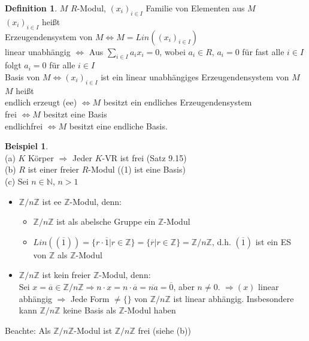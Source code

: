 \documentclass[10pt,a4paper,numbers=endperiod]{scrartcl}
\theoremstyle{definition}
\newtheorem{defi}[satz]{Definition}
\newtheorem{bsp}[satz]{Beispiel}
\def\NN{{\mathbb N}}
\def\ZZ{{\mathbb Z}}
\begin{document}
\begin{defi}
	$M$ $R$-Modul, $(x_i)_{i \in I}$ Familie von Elementen aus $M$\\
	$(x_i)_{i \in I}$ heißt\\
	Erzeugendensystem von $M \Leftrightarrow M = Lin((x_i)_{i \in I})$\\
	linear unabhängig $\Leftrightarrow$ Aus $\sum\limits_{i \in I} a_ix_i = 0$, wobei $a_i \in R$, $a_i = 0$ für fast alle $i \in I$ folgt $a_i = 0$ für alle $i \in I$\\
	Basis von $M \Leftrightarrow (x_i)_{i \in I}$ ist ein linear unabhängiges Erzeugendensystem von $M$\\
	
	$M$ heißt\\
	endlich erzeugt (ee) $\Leftrightarrow M$ besitzt ein endliches Erzeugendensystem\\
	frei $\Leftrightarrow M$ besitzt eine Basis\\
	endlichfrei $\Leftrightarrow M$ besitzt eine endliche Basis.
\end{defi}

\begin{bsp}
	$ $\\
	(a) $K$ Körper $\Rightarrow$ Jeder $K$-VR ist frei (Satz 9.15)\\
	(b) $R$ ist einer freier $R$-Modul ((1) ist eine Basis)\\
	(c) Sei $n \in \NN$, $n > 1$
	\begin{itemize}
		\item $\ZZ/n\ZZ$ ist ee $\ZZ$-Modul, denn: 
		\begin{itemize}
			\item $\ZZ/n\ZZ$ ist als abelsche Gruppe ein $\ZZ$-Modul
			\item $Lin((\overline{1})) = \{r \cdot \overline{1}| r \in \ZZ\} = \{ \overline{r}| r \in \ZZ\} = \ZZ/n\ZZ$, d.h. $(\overline{1})$ ist ein ES von $\ZZ$ als $\ZZ$-Modul
		\end{itemize}
		\item $\ZZ/n\ZZ$ ist kein freier $\ZZ$-Modul, denn:\\
		Sei $x = \overline{a} \in \ZZ/n\ZZ \Rightarrow n \cdot x = n \cdot \overline{a} = \overline{na} = \overline{0}$, aber $n \neq 0$. $\Rightarrow (x)$ linear abhängig $\Rightarrow$ Jede Form $\neq \{\}$ von $\ZZ/n\ZZ$ ist linear abhängig. Insbesondere kann $\ZZ/n\ZZ$ keine Basis als $\ZZ$-Modul haben
	\end{itemize}
	Beachte: Als $\ZZ/n\ZZ$-Modul ist $\ZZ/n\ZZ$ frei (siehe (b))
\end{bsp}
\end{document}
